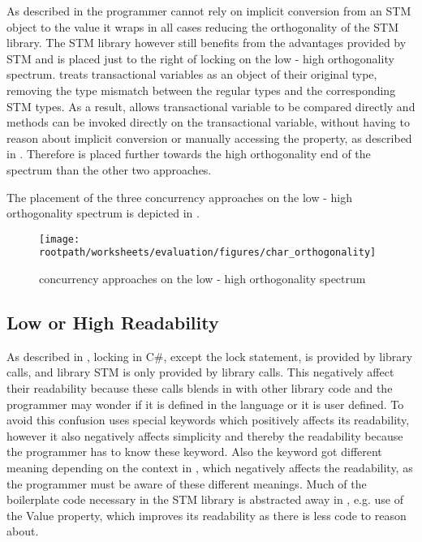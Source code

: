As described in  the programmer cannot rely on implicit conversion from an \ac{STM} object to the value it wraps in all cases reducing the orthogonality of the \ac{STM} library. The \ac{STM} library however still benefits from the advantages provided by \ac{STM} and is placed just to the right of locking on the low - high orthogonality spectrum. \stmnamesp treats transactional variables as an object of their original type, removing the type mismatch between the regular types and the corresponding \ac{STM} types. As a result, \stmname allows transactional variable to be compared directly and methods can be invoked directly on the transactional variable, without having to reason about implicit conversion or manually accessing the  property, as described in . Therefore \stmname is placed further towards the high orthogonality end of the spectrum than the other two approaches.

The placement of the three concurrency approaches on the low - high orthogonality spectrum is depicted in .


\begin{figure}[htbp]
\centering
 \texttt{[image: \\rootpath/worksheets/evaluation/figures/char\_orthogonality]} 
 \caption{concurrency approaches on the low - high orthogonality spectrum}
\label{fig:char_orthogonality}
\end{figure}

\subsection{Low or High Readability}\label{subsec:char_readability}
As described in , locking in C\#, except the lock statement, is provided by library calls, and library \ac{STM} is only provided by library calls. This negatively affect their readability because these calls blends in with other library code and the programmer may wonder if it is defined in the language or it is user defined. To avoid this confusion \stmname uses special keywords which positively affects its readability, however it also negatively affects simplicity and thereby the readability because the programmer has to know these keyword. Also the  keyword got different meaning depending on the context in \stmname, which negatively affects the readability, as the programmer must be aware of these different meanings. Much of the boilerplate code necessary in the \ac{STM} library is abstracted away in \stmname, e.g. use of the Value property, which improves its readability as there is less code to reason about.

